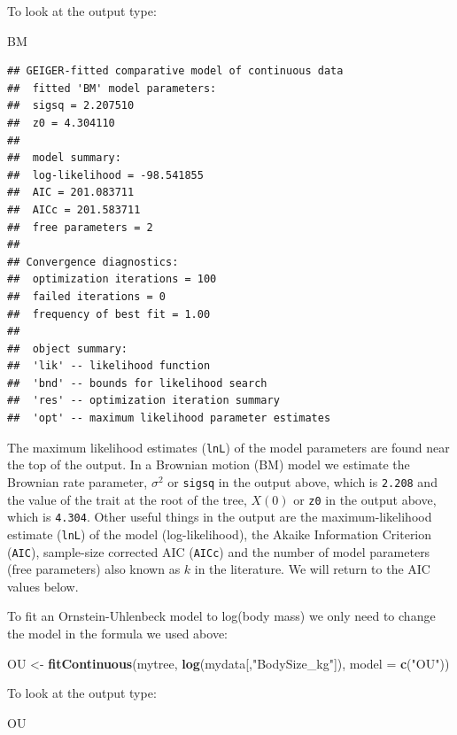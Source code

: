 \documentclass[]{book}
\newenvironment{Shaded}{\begin{snugshade}}{\end{snugshade}}
\newcommand{\KeywordTok}[1]{\textcolor[rgb]{0.13,0.29,0.53}{\textbf{{#1}}}}
\newcommand{\DataTypeTok}[1]{\textcolor[rgb]{0.13,0.29,0.53}{{#1}}}
\newcommand{\StringTok}[1]{\textcolor[rgb]{0.31,0.60,0.02}{{#1}}}
\newcommand{\NormalTok}[1]{{#1}}
\begin{document}
To look at the output type:

\begin{Shaded}
\begin{Highlighting}[]
\NormalTok{BM}
\end{Highlighting}
\end{Shaded}

\begin{verbatim}
## GEIGER-fitted comparative model of continuous data
##  fitted 'BM' model parameters:
##  sigsq = 2.207510
##  z0 = 4.304110
## 
##  model summary:
##  log-likelihood = -98.541855
##  AIC = 201.083711
##  AICc = 201.583711
##  free parameters = 2
## 
## Convergence diagnostics:
##  optimization iterations = 100
##  failed iterations = 0
##  frequency of best fit = 1.00
## 
##  object summary:
##  'lik' -- likelihood function
##  'bnd' -- bounds for likelihood search
##  'res' -- optimization iteration summary
##  'opt' -- maximum likelihood parameter estimates
\end{verbatim}

The maximum likelihood estimates (\texttt{lnL}) of the model parameters
are found near the top of the output. In a Brownian motion (BM) model we
estimate the Brownian rate parameter, \(\sigma^2\) or \texttt{sigsq} in
the output above, which is \texttt{2.208} and the value of the trait at
the root of the tree, \(X(0)\) or \texttt{z0} in the output above, which
is \texttt{4.304}. Other useful things in the output are the
maximum-likelihood estimate (\texttt{lnL}) of the model
(log-likelihood), the Akaike Information Criterion (\texttt{AIC}),
sample-size corrected AIC (\texttt{AICc}) and the number of model
parameters (free parameters) also known as \(k\) in the literature. We
will return to the AIC values below.

To fit an Ornstein-Uhlenbeck model to log(body mass) we only need to
change the model in the formula we used above:

\begin{Shaded}
\begin{Highlighting}[]
\NormalTok{OU <-}\StringTok{ }\KeywordTok{fitContinuous}\NormalTok{(mytree, }\KeywordTok{log}\NormalTok{(mydata[,}\StringTok{"BodySize_kg"}\NormalTok{]), }\DataTypeTok{model =} \KeywordTok{c}\NormalTok{(}\StringTok{"OU"}\NormalTok{))}
\end{Highlighting}
\end{Shaded}

To look at the output type:

\begin{Shaded}
\begin{Highlighting}[]
\NormalTok{OU}
\end{Highlighting}
\end{Shaded}
\end{document}
